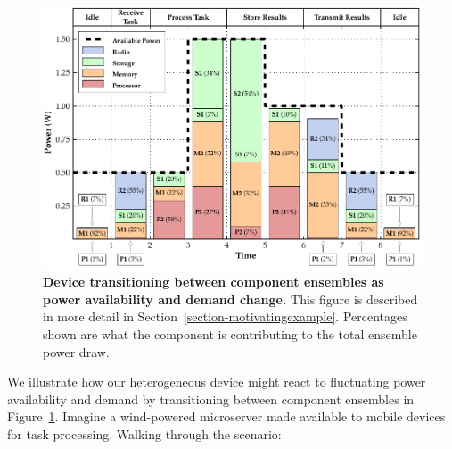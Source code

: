 \begin{figure}[t]
\centering
\includegraphics{./figures/transitiongraph.pdf}

\caption{\textbf{Device transitioning between component ensembles as power
availability and demand change.} This figure is described in more detail in
Section~\ref{section-motivatingexample}. Percentages shown are what the
component is contributing to the total ensemble power draw.}

\label{figure-transitiongraph}
\end{figure}

We illustrate how our heterogeneous device might react to fluctuating power
availability and demand by transitioning between component ensembles in
Figure~\ref{figure-transitiongraph}. Imagine a wind-powered microserver made
available to mobile devices for task processing. Walking through the
scenario:

